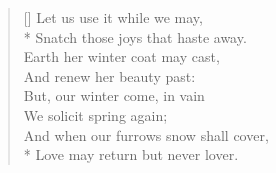 \documentclass[MAIN]{subfiles}
\begin{document}
\settowidth{\versewidth}{And when our furrows snow shall cover,}
\begin{verse}[\versewidth]
Let us use it while we may,\\*
Snatch those joys that haste away.\\
Earth her winter coat may cast,\\
And renew her beauty past:\\
But, our winter come, in vain\\
We solicit spring again;\\
And when our furrows snow shall cover,\\*
Love may return but never lover.
\end{verse}
\end{document}
